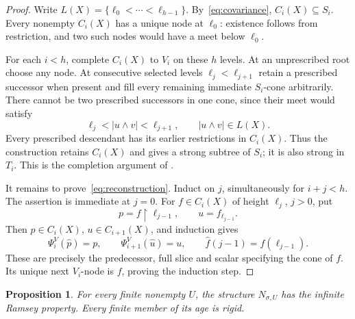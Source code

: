 \documentclass{article}
\numberwithin{equation}{section}
\newtheorem{proposition}[theorem]{Proposition}
\theoremstyle{definition}
\newcommand{\res}{\mathbin{\upharpoonright}}
\begin{document}
\begin{proof}
Write $L(X)=\{\ell_0<\cdots<\ell_{h-1}\}$. By~\eqref{eq:covariance},
$C_i(X)\subseteq S_i$. Every nonempty $C_i(X)$ has a unique node at
$\ell_0$: existence follows from restriction, and two such nodes would have
a meet below $\ell_0$.

For each $i<h$, complete $C_i(X)$ to $V_i$ on these $h$ levels. At an
unprescribed root choose any node. At consecutive selected levels
$\ell_j<\ell_{j+1}$ retain a prescribed successor when present and fill
every remaining immediate $S_i$-cone arbitrarily. There cannot be two
prescribed successors in one cone, since their meet would satisfy
\[
 \ell_j<|u\wedge v|<\ell_{j+1},\qquad |u\wedge v|\in L(X).
\]
Every prescribed descendant has its earlier restrictions in $C_i(X)$.
Thus the construction retains $C_i(X)$ and gives a strong subtree of $S_i$;
it is also strong in $T_i$. This is the completion argument of
\cite[Observation~2.1]{InfiniteLanguages}.

It remains to prove~\eqref{eq:reconstruction}. Induct on $j$, simultaneously
for $i+j<h$. The assertion is immediate at $j=0$. For
$f\in C_i(X)$ of height $\ell_j$, $j>0$, put
\[
 p=f\res\ell_{j-1},\qquad u=f_{\ell_{j-1}}.
\]
Then $p\in C_i(X)$, $u\in C_{i+1}(X)$, and induction gives
\[
 \Psi_i^V(\widehat p)=p,\qquad
 \Psi_{i+1}^V(\widehat u)=u,\qquad
 \widehat f(j-1)=f(\ell_{j-1}).
\]
These are precisely the predecessor, full slice and scalar specifying the
cone of $f$. Its unique next $V_i$-node is $f$, proving the induction step.
\end{proof}

\begin{proposition}\label{prop:source}
For every finite nonempty $U$, the structure $N_{\sigma,U}$ has the infinite Ramsey
property. Every finite member of its age is rigid.
\end{proposition}
\end{document}
